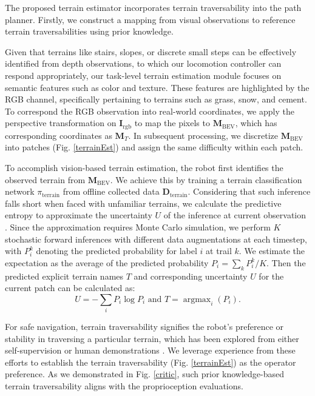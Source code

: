 \documentclass[conference]{IEEEtran}
\DeclareMathOperator*{\argmax}{argmax}
\begin{document}
{The proposed terrain estimator incorporates terrain traversability into the path planner. Firstly, we construct a mapping from visual observations to reference terrain traversabilities using prior knowledge.}

Given that terrains like stairs, slopes, or discrete small steps can be effectively identified from depth observations, to which our locomotion controller can respond appropriately, our task-level terrain estimation module focuses on semantic features such as color and texture. These features are highlighted by the RGB channel, specifically pertaining to terrains such as grass, snow, and cement. To correspond the RGB observation into real-world coordinates, we apply the perspective transformation on $\bm{I}_\textrm{rgb}$ to map the pixels to $\bm{M}_\textrm{BEV}$, which has corresponding coordinates as $\bm{M}_T$. In subsequent processing, we discretize $\bm{M}_\textrm{BEV}$ into patches (Fig. \ref{terrainEst})  and assign the same difficulty within each patch.

To accomplish vision-based terrain estimation, the robot first identifies the observed terrain from $\bm{M}_\textrm{BEV}$. We achieve this by training a terrain classification network ${\pi_{\textrm{terrain}}}$ from offline collected data $\bm{D}_{\textrm{terrain}}$. Considering that such inference falls short when faced with unfamiliar terrains, we calculate the predictive entropy to approximate the uncertainty $U$ of the inference at current observation \cite{wang2019aleatoric}. Since the approximation requires Monte Carlo simulation, we perform $K$ stochastic forward inferences with different data augmentations at each timestep, with $P_i^k$ denoting the predicted probability for label $i$ at trail $k$. We estimate the expectation as the average of the predicted probability $P_i=\sum_{k}P_i^k/K$. Then the predicted explicit terrain names $T$ and corresponding uncertainty $U$ for the current patch can be calculated as:
\begin{equation}
    U=-\sum_{i}{P_i} \log{P_i} \text{ and } T =\argmax_{i}(P_i).
\end{equation}

For safe navigation, terrain traversability signifies the robot's preference or stability in traversing a particular terrain, which has been explored from either self-supervision \cite{frey2023fast} or human demonstrations \cite{karnan2023sterling}. We leverage experience from these efforts to establish the terrain traversability (Fig. \ref{terrainEst}) as the operator preference. As we demonstrated in Fig. \ref{critic}, such prior knowledge-based terrain traversability aligns with the proprioception evaluations.
\end{document}
